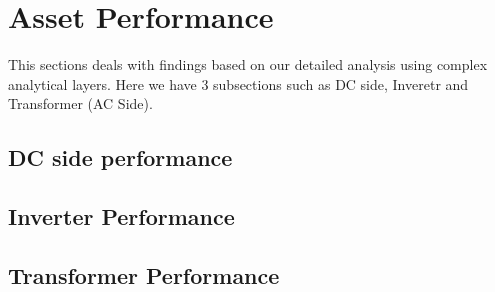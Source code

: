 \documentclass[18pt]{article}
\begin{document}
\section{Asset Performance}

This sections deals with findings based on our detailed analysis using complex analytical layers. Here we have 3 subsections such as DC side, Inveretr and Transformer (AC Side). 

\subsection{DC side performance}

\subsection{Inverter Performance}

\subsection{Transformer Performance}
\end{document}
